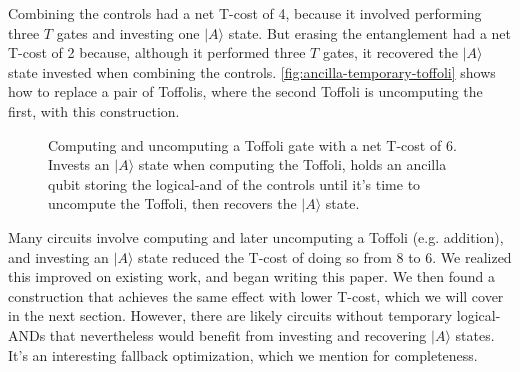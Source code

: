 \documentclass[twocolumn,longbibliography]{quantumarticle-customized}
\newcommand{\qH}{\gate{H}}
\newcommand{\qT}{\gate{T}}
\newcommand{\qTi}{\gate{T^\dagger}}
\newcommand{\qA}{\lstick{|A\rangle}}
\begin{document}
Combining the controls had a net T-cost of 4, because it involved performing three $T$ gates and investing one $|A\rangle$ state.
But erasing the entanglement had a net T-cost of 2 because, although it performed three $T$ gates, it recovered the $|A\rangle$ state invested when combining the controls.
\autoref{fig:ancilla-temporary-toffoli} shows how to replace a pair of Toffolis, where the second Toffoli is uncomputing the first, with this construction.

\begin{figure}
  \resizebox{\linewidth}{!}{
    \Qcircuit @R=1.5em @C=0.7em {
      &\ctrl{1}&\qw &\qw &\qw    &\qw &\qw &\ctrl{1}&\qw && &&&    &\qw     &\qw  &\ctrl{3}&\qw &\qw     &\qw  &\qw &\qw      &\qw &\qw &\qw    &\qw &\qw &\qw      &\qw &\qw &\qw     &\qw  &\ctrl{3}&\qw &\qw     &\qw &&\\
      &\ctrl{1}&\qw &\qw &\qw    &\qw &\qw &\ctrl{1}&\qw &&=&&&    &\ctrl{2}&\qw  &\qw     &\qw &\ctrl{2}&\qw  &\qw &\qw      &\qw &\qw &\qw    &\qw &\qw &\qw      &\qw &\qw &\ctrl{2}&\qw  &\qw     &\qw &\ctrl{2}&\qw &&\\
      &\targ   &\qw &    &\ldots &    &    &\targ   &\qw && &&&    &\qw     &\qw  &\qw     &\qw &\qw     &\qw  &\qw &\targ    &\qw &    &\ldots &    &    &\targ    &\qw &\qw &\qw     &\qw  &\qw     &\qw &\qw     &\qw &&\\
      &        &    &    &       &    &    &        &    && &&&\qA &\targ   &\qTi &\targ   &\qT &\targ   &\qTi &\qH &\ctrl{-1}&\qw &\qw &\qw    &\qw &\qw &\ctrl{-1}&\qH &\qT &\targ   &\qTi &\targ   &\qT &\targ   &\qw &|A\rangle &\\
    }
  }
  \caption{
	Computing and uncomputing a Toffoli gate with a net T-cost of 6.
	Invests an $|A\rangle$ state when computing the Toffoli, holds an ancilla qubit storing the logical-and of the controls until it's time to uncompute the Toffoli, then recovers the $|A\rangle$ state.
  }
  \label{fig:ancilla-temporary-toffoli}
\end{figure}

Many circuits involve computing and later uncomputing a Toffoli (e.g. addition), and investing an $|A\rangle$ state reduced the T-cost of doing so from 8 to 6.
We realized this improved on existing work, and began writing this paper.
We then found a construction that achieves the same effect with lower T-cost, which we will cover in the next section.
However, there are likely circuits without temporary logical-ANDs that nevertheless would benefit from investing and recovering $|A\rangle$ states.
It's an interesting fallback optimization, which we mention for completeness.
\end{document}

